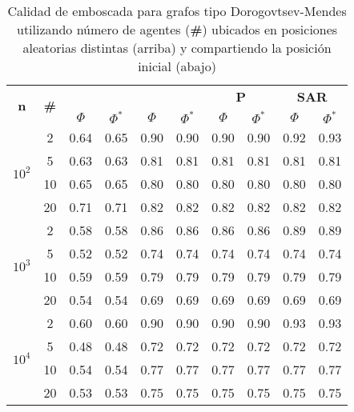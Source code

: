 \begin{table}
	\caption{Calidad de emboscada para grafos tipo Dorogovtsev-Mendes
	utilizando n\'umero de agentes (\textbf{\#}) ubicados en
	posiciones aleatorias distintas (arriba) y compartiendo la posici\'on
	inicial (abajo)}
	\label{tab:ambush_dm}
	\centering
	\begin{small}
		\setlength{\tabcolsep}{4pt}
		\begin{tabular}{|c|c|cc|cc|cc|cc|}
			\hline
			\multirow{2}{*}{\textbf{n}} &
			\multirow{2}{*}{\textbf{\#}} &
			\multicolumn{2}{c|}{\textbf{\astar}} &
			\multicolumn{2}{c|}{\textbf{\ambush}} &
			\multicolumn{2}{c|}{\textbf{P}} &
			\multicolumn{2}{c|}{\textbf{SAR}}\\
			& & $\Phi$ & $\Phi^*$ & $\Phi$ & $\Phi^*$&
			$\Phi$ & $\Phi^*$& $\Phi$ & $\Phi^*$\\
			\hline
			\multirow{4}{*}{$10^2$}
			 & 2 & 0.64 & 0.65 & 0.90 & 0.90 & 0.90 & 0.90 & 0.92 & 0.93\\
			 & 5 & 0.63 & 0.63 & 0.81 & 0.81 & 0.81 & 0.81 & 0.81 & 0.81\\
			 & 10 & 0.65 & 0.65 & 0.80 & 0.80 & 0.80 & 0.80 & 0.80 & 0.80\\
			 & 20 & 0.71 & 0.71 & 0.82 & 0.82 & 0.82 & 0.82 & 0.82 & 0.82\\
			\hline
			\multirow{4}{*}{$10^3$}
			 & 2 & 0.58 & 0.58 & 0.86 & 0.86 & 0.86 & 0.86 & 0.89 & 0.89\\
			 & 5 & 0.52 & 0.52 & 0.74 & 0.74 & 0.74 & 0.74 & 0.74 & 0.74\\
			 & 10 & 0.59 & 0.59 & 0.79 & 0.79 & 0.79 & 0.79 & 0.79 & 0.79\\
			 & 20 & 0.54 & 0.54 & 0.69 & 0.69 & 0.69 & 0.69 & 0.69 & 0.69\\
			 \hline
			\multirow{4}{*}{$10^4$}
			 & 2 & 0.60 & 0.60 & 0.90 & 0.90 & 0.90 & 0.90 & 0.93 & 0.93\\
			 & 5 & 0.48 & 0.48 & 0.72 & 0.72 & 0.72 & 0.72 & 0.72 & 0.72\\
			 & 10 & 0.54 & 0.54 & 0.77 & 0.77 & 0.77 & 0.77 & 0.77 & 0.77\\
			 & 20 & 0.53 & 0.53 & 0.75 & 0.75 & 0.75 & 0.75 & 0.75 & 0.75\\
			 \hline
		\end{tabular}
		

\end{small}
\end{table}
